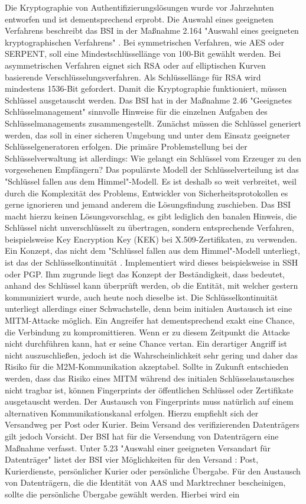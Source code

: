 \documentclass[11pt,a4paper]{report}
\begin{document}
Die Kryptographie von Authentifizierungslösungen wurde vor Jahrzehnten entworfen und ist dementsprechend erprobt. Die Auswahl eines geeigneten Verfahrens beschreibt das BSI in der Maßnahme 2.164 "Auswahl eines geeigneten kryptographischen Verfahrens" \cite{bsi_m2164}. Bei symmetrischen Verfahren, wie AES oder SERPENT, soll eine Mindestschlüssellänge von 100-Bit gewählt werden. Bei asymmetrischen Verfahren eignet sich RSA oder auf elliptischen Kurven basierende Verschlüsselungsverfahren. Als Schlüssellänge für RSA wird mindestens 1536-Bit gefordert. Damit die Kryptographie funktioniert, müssen Schlüssel ausgetauscht werden. Das BSI hat in der Maßnahme 2.46 "Geeignetes Schlüsselmanagement" sinnvolle Hinweise für die einzelnen Aufgaben des Schlüsselmanagements zusammengestellt. Zunächst müssen die Schlüssel generiert werden, das soll in einer sicheren Umgebung und unter dem Einsatz geeigneter Schlüsselgeneratoren erfolgen. Die primäre Problemstellung bei der Schlüsselverwaltung ist allerdings: Wie gelangt ein Schlüssel vom Erzeuger zu den vorgesehenen Empfängern? Das populärste Modell der Schlüsselverteilung ist das "Schlüssel fallen aus dem Himmel"-Modell. Es ist deshalb so weit verbreitet, weil durch die Komplexität des Problems, Entwickler von Sicherheitsprotokollen es gerne ignorieren und jemand anderem die Lösungsfindung zuschieben. Das BSI macht hierzu keinen Lösungsvorschlag, es gibt lediglich den banalen Hinweis, die Schlüssel nicht unverschlüsselt zu übertragen, sondern entsprechende Verfahren, beispielsweise Key Encryption Key (KEK) bei X.509-Zertifikaten, zu verwenden. Ein Konzept, das nicht dem "Schlüssel fallen aus dem Himmel"-Modell unterliegt, ist das der Schlüsselkontinuität \cite{ietf_kcm}. Implementiert wird dieses beispielsweise in SSH oder PGP. Ihm zugrunde liegt das Konzept der Beständigkeit, dass bedeutet, anhand des Schlüssel kann überprüft werden, ob die Entität, mit welcher gestern kommuniziert wurde, auch heute noch dieselbe ist. Die Schlüsselkontinuität unterliegt allerdings einer Schwachstelle, denn beim initialen Austausch ist eine MITM-Attacke möglich. Ein Angreifer hat dementsprechend exakt eine Chance, die Verbindung zu kompromittieren. Wenn er zu diesem Zeitpunkt die Attacke nicht durchführen kann, hat er seine Chance vertan. Ein derartiger Angriff ist nicht auszuschließen, jedoch ist die Wahrscheinlichkeit sehr gering und daher das Risiko für die M2M-Kommunikation akzeptabel. Sollte in Zukunft entschieden werden, dass das Risiko eines MITM während des initialen Schlüsselaustausches nicht tragbar ist, können Fingerprints der öffentlichen Schlüssel oder Zertifikate ausgetauscht werden. Der Austausch von Fingerprints muss natürlich auf einem alternativen Kommunikationskanal erfolgen. Hierzu empfiehlt sich der Versandweg per Post oder Kurier. Beim Versand des verifizierenden Datenträgers gilt jedoch Vorsicht. Der BSI hat für die Versendung von Datenträgern eine Maßnahme verfasst. Unter 5.23 "Auswahl einer geeigneten Versandart für Datenträger" listet der BSI vier Möglichkeiten für den Versand \cite{bsi_m5023}: Post, Kurierdienste, persönlicher Kurier oder persönliche Übergabe. Für den Austausch von Datenträgern, die die Identität von AAS und Marktrechner bescheinigen, sollte die persönliche Übergabe gewählt werden. Hierbei wird ein 
\end{document}
